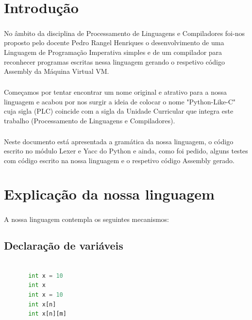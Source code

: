 \documentclass[11pt,a4paper]{report}
\begin{document}
    \tableofcontents
    
    \pagebreak
    
    \chapter{Introdução}
% 
    \paragraph{}
    No âmbito da disciplina de Processamento de Linguagens e Compiladores foi-nos proposto pelo docente Pedro Rangel Henriques o desenvolvimento de uma Linguagem de Programação Imperativa simples e de um compilador para reconhecer programas escritas nessa linguagem gerando o respetivo código Assembly da Máquina Virtual VM.
    \paragraph{}
    Começamos por tentar encontrar um nome original e atrativo para a nossa linguagem e acabou por nos surgir a ideia de colocar o nome "Python-Like-C" cuja sigla (PLC) coincide com a sigla da Unidade Curricular que integra este trabalho (Processamento de Linguagens e Compiladores).
    

    \paragraph{}
    Neste documento está apresentada a gramática da nossa linguagem, o código escrito no módulo Lexer e Yacc do Python e ainda, como foi pedido, alguns testes com código escrito na nossa linguagem e o respetivo código Assembly gerado.

    \chapter{Explicação da nossa linguagem}
    \paragraph{}
    A nossa linguagem contempla os seguintes mecanismos:
    \section{Declaração de variáveis}
    \begin{lstlisting}[language=Python]
    
       int x = 10
       int x
       int x = 10
       int x[n]
       int x[n][m]
    \end{lstlisting}
\end{document}
